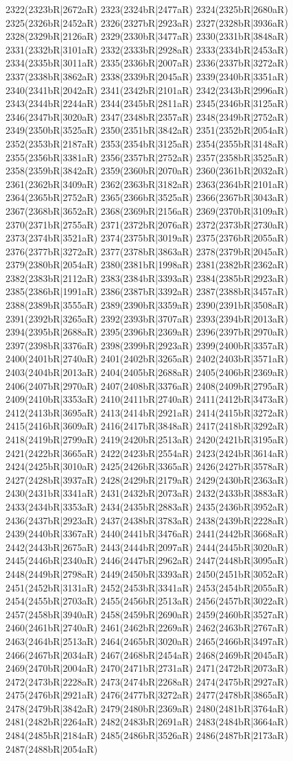 2322(2323bR|2672aR) 2323(2324bR|2477aR) 2324(2325bR|2680aR) 2325(2326bR|2452aR) 2326(2327bR|2923aR) 2327(2328bR|3936aR) 2328(2329bR|2126aR) 2329(2330bR|3477aR) 2330(2331bR|3848aR) 2331(2332bR|3101aR) 2332(2333bR|2928aR) 2333(2334bR|2453aR) 2334(2335bR|3011aR) 2335(2336bR|2007aR) 2336(2337bR|3272aR) 2337(2338bR|3862aR) 2338(2339bR|2045aR) 2339(2340bR|3351aR) 2340(2341bR|2042aR) 2341(2342bR|2101aR) 2342(2343bR|2996aR) 2343(2344bR|2244aR) 2344(2345bR|2811aR) 2345(2346bR|3125aR) 2346(2347bR|3020aR) 2347(2348bR|2357aR) 2348(2349bR|2752aR) 2349(2350bR|3525aR) 2350(2351bR|3842aR) 2351(2352bR|2054aR) 2352(2353bR|2187aR) 2353(2354bR|3125aR) 2354(2355bR|3148aR) 2355(2356bR|3381aR) 2356(2357bR|2752aR) 2357(2358bR|3525aR) 2358(2359bR|3842aR) 2359(2360bR|2070aR) 2360(2361bR|2032aR) 2361(2362bR|3409aR) 2362(2363bR|3182aR) 2363(2364bR|2101aR) 2364(2365bR|2752aR) 2365(2366bR|3525aR) 2366(2367bR|3043aR) 2367(2368bR|3652aR) 2368(2369bR|2156aR) 2369(2370bR|3109aR) 2370(2371bR|2755aR) 2371(2372bR|2076aR) 2372(2373bR|2730aR) 2373(2374bR|3521aR) 2374(2375bR|3019aR) 2375(2376bR|2055aR) 2376(2377bR|3272aR) 2377(2378bR|3863aR) 2378(2379bR|2045aR) 2379(2380bR|2054aR) 2380(2381bR|1998aR) 2381(2382bR|2362aR) 2382(2383bR|2112aR) 2383(2384bR|3393aR) 2384(2385bR|2923aR) 2385(2386bR|1991aR) 2386(2387bR|3392aR) 2387(2388bR|3457aR) 2388(2389bR|3555aR) 2389(2390bR|3359aR) 2390(2391bR|3508aR) 2391(2392bR|3265aR) 2392(2393bR|3707aR) 2393(2394bR|2013aR) 2394(2395bR|2688aR) 2395(2396bR|2369aR) 2396(2397bR|2970aR) 2397(2398bR|3376aR) 2398(2399bR|2923aR) 2399(2400bR|3357aR) 2400(2401bR|2740aR) 2401(2402bR|3265aR) 2402(2403bR|3571aR) 2403(2404bR|2013aR) 2404(2405bR|2688aR) 2405(2406bR|2369aR) 2406(2407bR|2970aR) 2407(2408bR|3376aR) 2408(2409bR|2795aR) 2409(2410bR|3353aR) 2410(2411bR|2740aR) 2411(2412bR|3473aR) 2412(2413bR|3695aR) 2413(2414bR|2921aR) 2414(2415bR|3272aR) 2415(2416bR|3609aR) 2416(2417bR|3848aR) 2417(2418bR|3292aR) 2418(2419bR|2799aR) 2419(2420bR|2513aR) 2420(2421bR|3195aR) 2421(2422bR|3665aR) 2422(2423bR|2554aR) 2423(2424bR|3614aR) 2424(2425bR|3010aR) 2425(2426bR|3365aR) 2426(2427bR|3578aR) 2427(2428bR|3937aR) 2428(2429bR|2179aR) 2429(2430bR|2363aR) 2430(2431bR|3341aR) 2431(2432bR|2073aR) 2432(2433bR|3883aR) 2433(2434bR|3353aR) 2434(2435bR|2883aR) 2435(2436bR|3952aR) 2436(2437bR|2923aR) 2437(2438bR|3783aR) 2438(2439bR|2228aR) 2439(2440bR|3367aR) 2440(2441bR|3476aR) 2441(2442bR|3668aR) 2442(2443bR|2675aR) 2443(2444bR|2097aR) 2444(2445bR|3020aR) 2445(2446bR|2340aR) 2446(2447bR|2962aR) 2447(2448bR|3095aR) 2448(2449bR|2798aR) 2449(2450bR|3393aR) 2450(2451bR|3052aR) 2451(2452bR|3131aR) 2452(2453bR|3341aR) 2453(2454bR|2055aR) 2454(2455bR|2703aR) 2455(2456bR|2513aR) 2456(2457bR|3022aR) 2457(2458bR|3940aR) 2458(2459bR|2690aR) 2459(2460bR|3527aR) 2460(2461bR|2740aR) 2461(2462bR|2269aR) 2462(2463bR|2767aR) 2463(2464bR|2513aR) 2464(2465bR|3020aR) 2465(2466bR|3497aR) 2466(2467bR|2034aR) 2467(2468bR|2454aR) 2468(2469bR|2045aR) 2469(2470bR|2004aR) 2470(2471bR|2731aR) 2471(2472bR|2073aR) 2472(2473bR|2228aR) 2473(2474bR|2268aR) 2474(2475bR|2927aR) 2475(2476bR|2921aR) 2476(2477bR|3272aR) 2477(2478bR|3865aR) 2478(2479bR|3842aR) 2479(2480bR|2369aR) 2480(2481bR|3764aR) 2481(2482bR|2264aR) 2482(2483bR|2691aR) 2483(2484bR|3664aR) 2484(2485bR|2184aR) 2485(2486bR|3526aR) 2486(2487bR|2173aR) 2487(2488bR|2054aR) 